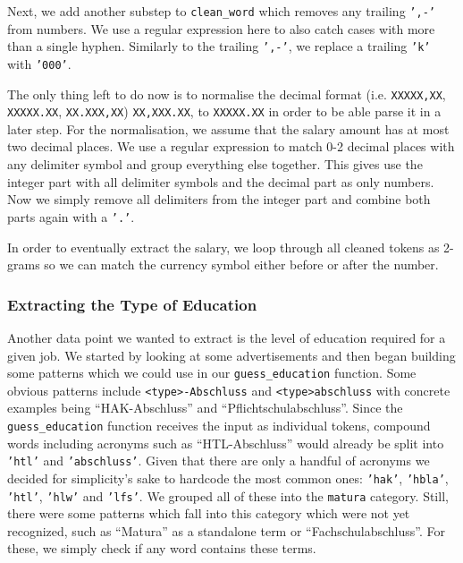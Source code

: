 \documentclass[runningheads]{llncs}
\begin{document}
Next, we add another substep to \texttt{clean\_word} which removes any trailing \texttt{',-'} from numbers. We use a regular expression here to also catch cases with more than a single hyphen. Similarly to the trailing \texttt{',-'}, we replace a trailing \texttt{'k'} with \texttt{'000'}.

The only thing left to do now is to normalise the decimal format (i.e. \texttt{XXXXX,XX}, \texttt{XXXXX.XX}, \texttt{XX.XXX,XX}) \texttt{XX,XXX.XX}, to \texttt{XXXXX.XX} in order to be able parse it in a later step. For the normalisation, we assume that the salary amount has at most two decimal places. We use a regular expression to match 0-2 decimal places with any delimiter symbol and group everything else together. This gives use the integer part with all delimiter symbols and the decimal part as only numbers. Now we simply remove all delimiters from the integer part and combine both parts again with a \texttt{'.'}.

In order to eventually extract the salary, we loop through all cleaned tokens as 2-grams so we can match the currency symbol either before or after the number.

\subsubsection{Extracting the Type of Education}
\label{subsub:extracting_the_type_of_education}

Another data point we wanted to extract is the level of education required for a given job. We started by looking at some advertisements and then began building some patterns which we could use in our \texttt{guess\_education} function. Some obvious patterns include \texttt{<type>-Abschluss} and \texttt{<type>abschluss} with concrete examples being “HAK-Abschluss” and “Pflichtschulabschluss”. Since the \texttt{guess\_education} function receives the input as individual tokens, compound words including acronyms such as “HTL-Abschluss” would already be split into \texttt{'htl'} and \texttt{'abschluss'}. Given that there are only a handful of acronyms we decided for simplicity's sake to hardcode the most common ones: \texttt{'hak'}, \texttt{'hbla'}, \texttt{'htl'}, \texttt{'hlw'} and \texttt{'lfs'}. We grouped all of these into the \texttt{matura} category. Still, there were some patterns which fall into this category which were not yet recognized, such as “Matura” as a standalone term or “Fachschulabschluss”. For these, we simply check if any word contains these terms.
\end{document}
